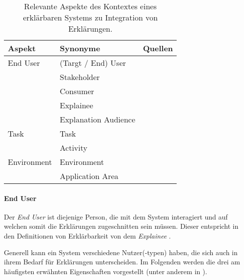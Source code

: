 \begin{table}[bht!]
    \begin{tabular}{|p{}|p{}|p{}|}
        \hline
        \textbf{Aspekt} & \textbf{Synonyme} & \textbf{Quellen} \\ \hline
        End User        &  (Targt / End)  User & \cite{chazette2020explainability} \cite{kaptein_personalised_2017} \cite{sokol_one_2020} \cite{wiegand_id_2020} \\
                        & Stakeholder & \cite{chazette_knowledge_nodate} \\
                        & Consumer & \cite{ehsan_human-centered_2020} \\
                        & Explainee & \cite{chazette_knowledge_nodate} \cite{kohl_explainability_2019} \\
                        & Explanation Audience & \cite{sokol_explainability_2020} \\
        \hline
        Task            & Task & \cite{chazette_knowledge_nodate} \cite{sokol_explainability_2020} \cite{gunning2019darpa} \\
                        & Activity & \cite{wohlin2012experimentation} \\
        \hline
        Environment     & Environment & \cite{chazette_knowledge_nodate} \cite{wiegand_id_2020} \cite{wiegand2019drive} \\
                        & Application Area & \cite{sokol_explainability_2020} \cite{wiegand2019drive} \cite{wiegand_id_2020} \\
        \hline
    \end{tabular}
    \caption{Relevante Aspekte des Kontextes eines erklärbaren Systems zu Integration von Erklärungen.}
    \label{tab:impact_of_context_on_explanation}
\end{table}

\paragraph{End User} Der \textit{End User} ist diejenige Person, die mit dem System interagiert und auf welchen somit die Erklärungen zugeschnitten sein müssen. Dieser entspricht in den Definitionen von Erklärbarkeit von \citeauthor{chazette_knowledge_nodate,kohl_explainability_2019} dem \textit{Explainee} \cite{chazette_knowledge_nodate,kohl_explainability_2019}.

Generell kann ein System verschiedene Nutzer(-typen) haben, die sich auch in ihrem Bedarf für Erklärungen unterscheiden. Im Folgenden werden die drei am häufigsten erwähnten Eigenschaften vorgestellt (unter anderem in \cite{chazette_knowledge_nodate,tintarev_designing_nodate,yamada_evaluating_2016}).

